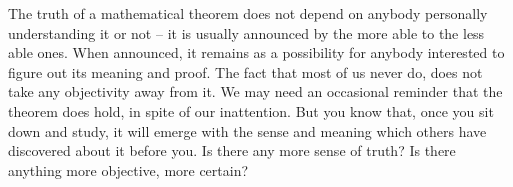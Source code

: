 The truth of a mathematical theorem does not depend on anybody personally
understanding it or not -- it is usually announced by the more able to the less
able ones. When announced, it remains as a possibility for anybody interested to
figure out its meaning and proof. The fact that most of us never do, does not
take any {objectivity} away from it. We may need an occasional reminder that the
theorem does hold, in spite of our inattention. But you know that, once you sit
down and study, it will emerge with the sense and meaning which others have
discovered about it before you. Is there any more  sense of truth?
Is there anything more objective, more certain?







